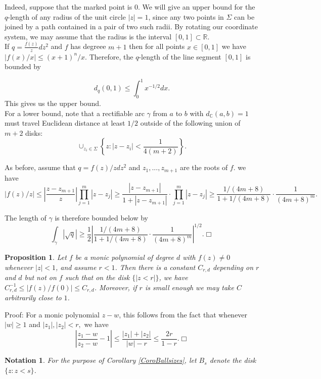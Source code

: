\documentclass[12pt]{article}
\newtheorem{proposition}[theorem]{Proposition}
\newtheorem{notation}[theorem]{Notation}
\newcommand{\rr}{\mathbb{R}}
\newcommand{\cc}{\mathbb{C}}
\begin{document}
\noindent Indeed, suppose that the marked point is $0$. We will give an upper bound for the $q$-length of any radius of the unit circle $|z| = 1$, since any two points in $\Sigma$ can be joined by a path contained in a pair of two such radii. By rotating our coordinate system, we may assume that the radius is the interval $[0,1] \subset \rr$.\\

\noindent If $q = \frac{f(z)}{z}dz^2$ and $f$ has degreee $m+1$ then for all points $x \in [0,1]$ we have $|f(x)/x| \leq (x+1)^n/x$. Therefore, the $q$-length of the line segment $[0,1]$ is bounded by

$$d_q(0,1) \leq \int_0^1 x^{-1/2} dx.$$ This gives us the upper bound.\\

\noindent For a lower bound, note that a rectifiable arc $\gamma$ from $a$ to $b$ with $d_\cc(a,b) = 1$ must travel Euclidean distance at least $1/2$ outside of the following union of $m+2$ disks: $$\cup_{z_i \in \Sigma}\left\{z: |z - z_i| < \frac{1}{4(m+2)}\right\}.$$

\noindent As before, assume that $q = f(z)/z dz^2$ and $z_1,...,z_{m+1}$ are the roots of $f$. we have $$|f(z)/z| \leq \left|\frac{z - z_{m+1}}{z}\right| \prod_{j = 1}^m |z - z_j| \geq \frac{|z - z_{m+1}|}{1 + |z - z_{m+1}|}\cdot \prod_{j = 1}^m |z - z_j| \geq \frac{1/(4m+8)}{1 + 1/(4m+8)}\cdot \frac{1}{(4m+8)^m}.$$

\noindent The length of $\gamma$ is therefore bounded below by $$\int_\gamma |\sqrt{q}| \geq \frac{1}{2}\left| \frac{1/(4m+8)}{1 + 1/(4m+8)} \cdot \frac{1}{(4m+8)^m}\right|^{1/2}. \Box$$

\begin{proposition}\label{PropPolyScale}Let $f$ be a monic polynomial of degree $d$ with $f(z) \neq 0$ whenever $|z| < 1$, and assume $r < 1$. Then there is a constant $C_{r,d}$ depending on $r$ and $d$ but not on $f$ such that on the disk $\{|z < r|\}$, we have $C_{r,d}^{-1} \leq |f(z)/f(0)| \leq C_{r,d}$. Moreover, if $r$ is small enough we may take $C$ arbitrarily close to $1$.\end{proposition}

\noindent Proof: For a monic polynomial $z - w$, this follows from the fact that whenever $|w| \geq 1$ and $|z_1|,|z_2| < r,$ we have $$\left|\frac{z_1-w}{z_2-w} - 1\right| \leq \frac{|z_1| + |z_2|}{|w| - r} \leq \frac{2r}{1-r}. \Box$$

\begin{notation}For the purpose of Corollary \ref{CoroBallsizes}, let $B_s$ denote the disk $\{z: z < s\}$.\end{notation}
\end{document}
